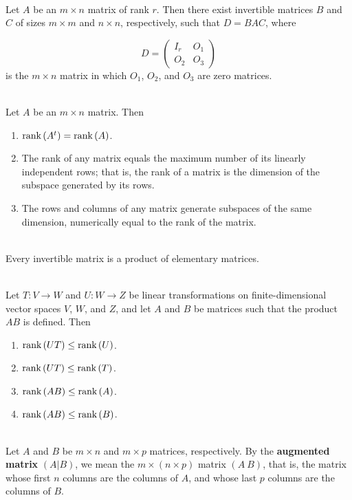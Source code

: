 \begin{corollary}
	\hfill\\
	Let $A$ be an $m \times n$ matrix of rank $r$. Then there exist invertible matrices $B$ and $C$ of sizes $m \times m$ and $n \times n$, respectively, such that $D=BAC$, where

	\[D = \begin{pmatrix}
			I_r & O_1 \\
			O_2 & O_3
		\end{pmatrix}\]
	is the $m \times n$ matrix in which $O_1$, $O_2$, and $O_3$ are zero matrices.
\end{corollary}

\begin{corollary}
	\hfill\\
	Let $A$ be an $m \times n$ matrix. Then

	\begin{enumerate}
		\item $\text{rank}\left(A^t\right) = \text{rank}\left(A\right)$.
		\item The rank of any matrix equals the maximum number of its linearly independent rows; that is, the rank of a matrix is the dimension of the subspace generated by its rows.
		\item The rows and columns of any matrix generate subspaces of the same dimension, numerically equal to the rank of the matrix.
	\end{enumerate}
\end{corollary}

\begin{corollary}
	\hfill\\
	Every invertible matrix is a product of elementary matrices.
\end{corollary}

\begin{theorem}
	\hfill\\
	Let $T: V \to W$ and $U: W \to Z$ be linear transformations on finite-dimensional vector spaces $V$, $W$, and $Z$, and let $A$ and $B$ be matrices such that the product $AB$ is defined. Then

	\begin{enumerate}
		\item $\text{rank}\left(UT\right) \leq \text{rank}\left(U\right)$.
		\item $\text{rank}\left(UT\right) \leq \text{rank}\left(T\right)$.
		\item $\text{rank}\left(AB\right) \leq \text{rank}\left(A\right)$.
		\item $\text{rank}\left(AB\right) \leq \text{rank}\left(B\right)$.
	\end{enumerate}
\end{theorem}

\begin{definition}
	\hfill\\
	Let $A$ and $B$ be $m \times n$ and $m \times p$ matrices, respectively. By the \textbf{augmented matrix} $(A|B)$, we mean the $m \times (n \times p)$ matrix $(A\ B)$, that is, the matrix whose first $n$ columns are the columns of $A$, and whose last $p$ columns are the columns of $B$.
\end{definition}
